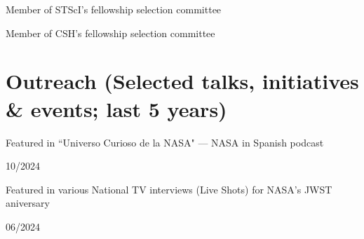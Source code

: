 \documentclass[12pt, a4paper]{article} %
\begin{document}
\vspace{0.2cm}

\begin{minipage}[t]{0.7\textwidth}
\begin{flushleft}%
  \setlength{\leftskip}{0.2cm}%
Member of STScI's fellowship selection committee
\end{flushleft}
\end{minipage}
\begin{minipage}[t]{0.3\textwidth}
\hfill 
\end{minipage}

\vspace{0.2cm}

\begin{minipage}[t]{0.7\textwidth}
\begin{flushleft}%
  \setlength{\leftskip}{0.2cm}%
Member of CSH's fellowship selection committee
\end{flushleft}
\end{minipage}
\begin{minipage}[t]{0.3\textwidth}
\hfill 
\end{minipage}

\section*{Outreach (Selected talks, initiatives \& events; last 5 years)}

\begin{minipage}[t]{0.7\textwidth}
\begin{flushleft}%
  \setlength{\leftskip}{0.2cm}%
Featured in ``Universo Curioso de la NASA" --- NASA in Spanish podcast
\end{flushleft}
\end{minipage}
\begin{minipage}[t]{0.3\textwidth}
\hfill 10/2024
\end{minipage}

\vspace{0.2cm}

\begin{minipage}[t]{0.7\textwidth}
\begin{flushleft}%
  \setlength{\leftskip}{0.2cm}%
Featured in various National TV interviews (Live Shots) for NASA's JWST aniversary
\end{flushleft}
\end{minipage}
\begin{minipage}[t]{0.3\textwidth}
\hfill 06/2024
\end{minipage}
\end{document}
